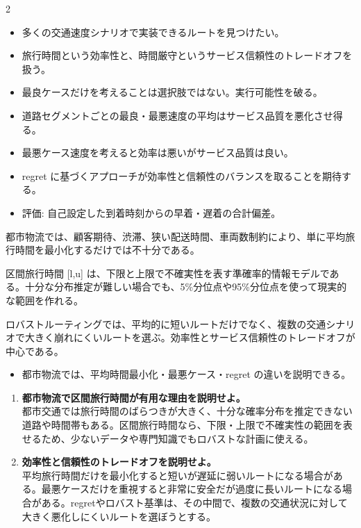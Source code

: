\clearpage
{}
\begin{multicols}{2}\footnotesize\raggedcolumns
{}
\begin{itemize}
\item 多くの交通速度シナリオで実装できるルートを見つけたい。
\item 旅行時間という効率性と、時間厳守というサービス信頼性のトレードオフを扱う。
\item 最良ケースだけを考えることは選択肢ではない。実行可能性を破る。
\item 道路セグメントごとの最良・最悪速度の平均はサービス品質を悪化させ得る。
\item 最悪ケース速度を考えると効率は悪いがサービス品質は良い。
\item regret に基づくアプローチが効率性と信頼性のバランスを取ることを期待する。
\item 評価: 自己設定した到着時刻からの早着・遅着の合計偏差。
\end{itemize}
都市物流では、顧客期待、渋滞、狭い配送時間、車両数制約により、単に平均旅行時間を最小化するだけでは不十分である。\par

区間旅行時間 [l,u] は、下限と上限で不確実性を表す準確率的情報モデルである。十分な分布推定が難しい場合でも、5\%分位点や95\%分位点を使って現実的な範囲を作れる。\par

ロバストルーティングでは、平均的に短いルートだけでなく、複数の交通シナリオで大きく崩れにくいルートを選ぶ。効率性とサービス信頼性のトレードオフが中心である。\par
{}
\begin{itemize}
\item 都市物流では、平均時間最小化・最悪ケース・regret の違いを説明できる。
\end{itemize}
\begin{enumerate}
\item \textbf{都市物流で区間旅行時間が有用な理由を説明せよ。}\\都市交通では旅行時間のばらつきが大きく、十分な確率分布を推定できない道路や時間帯もある。区間旅行時間なら、下限・上限で不確実性の範囲を表せるため、少ないデータや専門知識でもロバストな計画に使える。
\item \textbf{効率性と信頼性のトレードオフを説明せよ。}\\平均旅行時間だけを最小化すると短いが遅延に弱いルートになる場合がある。最悪ケースだけを重視すると非常に安全だが過度に長いルートになる場合がある。regretやロバスト基準は、その中間で、複数の交通状況に対して大きく悪化しにくいルートを選ぼうとする。
\end{enumerate}
\end{multicols}

